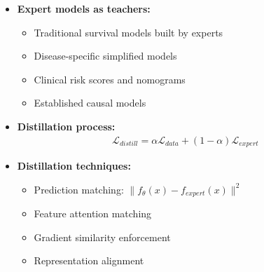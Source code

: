 \begin{itemize}
    \item \textbf{Expert models as teachers:}
    \begin{itemize}
        \item Traditional survival models built by experts
        \item Disease-specific simplified models
        \item Clinical risk scores and nomograms
        \item Established causal models
    \end{itemize}

    \item \textbf{Distillation process:}
    \begin{align}
        \mathcal{L}_{distill} = \alpha \mathcal{L}_{data} + (1-\alpha) \mathcal{L}_{expert}
    \end{align}

    \item \textbf{Distillation techniques:}
    \begin{itemize}
        \item Prediction matching: $\|f_\theta(x) - f_{expert}(x)\|^2$
        \item Feature attention matching
        \item Gradient similarity enforcement
        \item Representation alignment
    \end{itemize}
\end{itemize}

